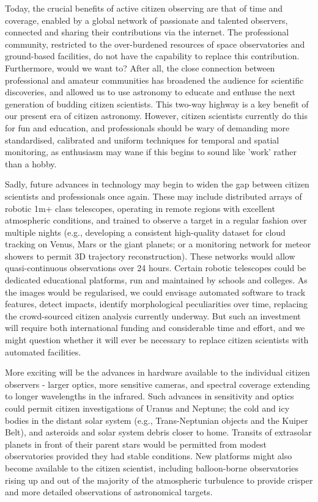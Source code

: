 \documentclass{ar2e}
\begin{document}
Today, the crucial benefits of active citizen observing are that of time and
coverage, enabled by a global network of passionate and talented observers,
connected and sharing their contributions via the internet.  The professional
community, restricted to the over-burdened resources of space observatories
and ground-based facilities, do not have the capability to replace this
contribution. Furthermore, would we want to?  After all, the close connection
between professional and amateur communities has broadened the audience for
scientific discoveries, and allowed us to use astronomy to educate and enthuse
the next generation of budding citizen scientists.  This two-way highway is a
key benefit of our present era of citizen astronomy.  However, citizen
scientists currently do this for fun and education, and professionals should
be wary of demanding more standardised, calibrated and uniform techniques for
temporal and spatial monitoring, as enthusiasm may wane if this begins to
sound like 'work' rather than a hobby.

Sadly, future advances in technology may begin to widen the gap between
citizen scientists and professionals once again. These may include distributed
arrays of robotic 1m+ class telescopes, operating in remote regions with
excellent atmospheric conditions, and trained to observe a target in a regular
fashion over multiple nights (e.g., developing a consistent high-quality
dataset for cloud tracking on Venus, Mars or the giant planets; or a
monitoring network for meteor showers to permit 3D trajectory
reconstruction).  These networks would allow quasi-continuous observations
over 24 hours.  Certain robotic telescopes could be dedicated educational
platforms, run and maintained by schools and colleges.  As the images would be
regularised, we could envisage automated software to track features, detect
impacts, identify morphological peculiarities over time, replacing the
crowd-sourced citizen analysis currently underway.  But such an investment
will require both international funding and considerable time and effort, and
we might question whether it will ever be necessary to replace citizen
scientists with automated facilities.

More exciting will be the advances in hardware available to the individual
citizen observers - larger optics, more sensitive cameras, and spectral
coverage extending to longer wavelengths in the infrared.  Such advances in
sensitivity and optics could permit citizen investigations of Uranus and
Neptune; the cold and icy bodies in the distant solar system (e.g.,
Trans-Neptunian objects and the Kuiper Belt), and asteroids and solar system
debris closer to home.  Transits of extrasolar planets in front of their
parent stars would be permitted from modest observatories provided they had
stable conditions.  New platforms might also become available to the citizen
scientist, including balloon-borne observatories rising up and out of the
majority of the atmospheric turbulence to provide crisper and more detailed
observations of astronomical targets. 
\end{document}
